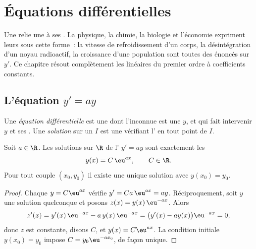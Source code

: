 \chapter{Équations différentielles}\label{ch:g12:diffeq}

Une  relie une  à ses . La physique,
la chimie, la biologie et l'économie expriment leurs  sous cette forme~:
la vitesse de refroidissement d'un corps, la désintégration d'un noyau
radioactif, la croissance d'une population sont toutes des énoncés sur
$y'$. Ce chapitre résout complètement les  linéaires du premier
ordre à coefficients constants.

\section{L'équation \texorpdfstring{$y' = ay$}{y' = ay}}

\begin{definition}\label{def:g12:diffeq:ode}
Une \emph{équation différentielle} est une
 dont l'inconnue est une  $y$, et qui fait intervenir $y$ et
ses . Une \emph{solution} sur un  $I$ est une 
 vérifiant l' en tout point de $I$.
\end{definition}

\begin{theorem}[Solutions de $y' = ay$]\label{thm:g12:diffeq:homogeneous}
Soit $a \in \R$. Les solutions sur $\R$ de l' $y' = ay$ sont
exactement les 
\[
y(x) = C\,\eu^{ax}, \qquad C \in \R .
\]
Pour tout couple $(x_0, y_0)$ il existe une unique solution avec
$y(x_0) = y_0$.
\end{theorem}

\begin{proof}
Chaque $y = C\eu^{ax}$ vérifie $y' = Ca\,\eu^{ax} = ay$. Réciproquement, soit
$y$ une solution quelconque et posons $z(x) = y(x)\,\eu^{-ax}$. Alors
\[
z'(x) = y'(x)\,\eu^{-ax} - a\,y(x)\,\eu^{-ax}
= \bigl(y'(x) - a y(x)\bigr)\eu^{-ax} = 0,
\]
donc $z$ est constante, disons $C$, et $y(x) = C\eu^{ax}$. La condition
initiale $y(x_0) = y_0$ impose $C = y_0 \eu^{-a x_0}$, de façon unique.
\end{proof}

